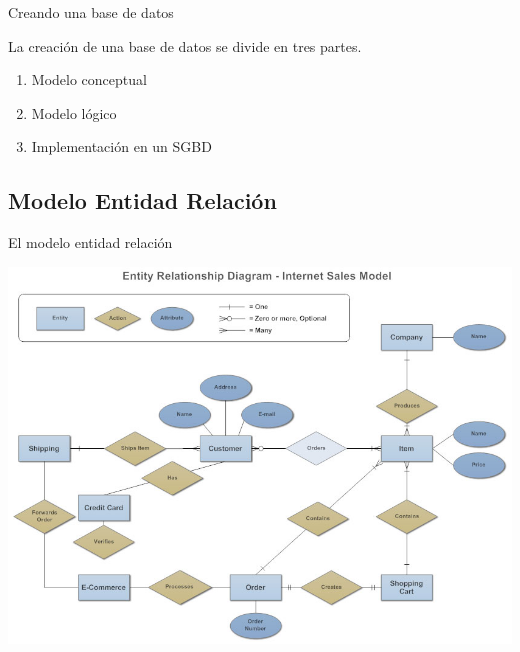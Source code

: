 \documentclass[11pt]{beamer}
\begin{document}
\begin{frame}{Creando una base de datos}

La creación de una base de datos se divide en tres partes.

\begin{enumerate}
\item Modelo conceptual

\item Modelo lógico

\item Implementación en un SGBD 
\end{enumerate}



\end{frame}



\subsection{Modelo Entidad Relación}


\begin{frame}{El modelo entidad relación}

\begin{center}
\includegraphics[scale=0.3]{images/erd.jpg} 

\end{center}

\end{frame}



\end{document}
